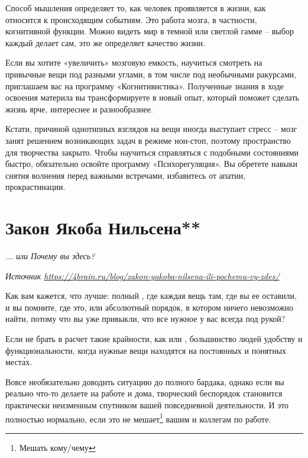 Способ мышления определяет то, как человек проявляется в жизни, как относится к происходящим событиям. Это работа мозга, в частности, когнитивной функции. Можно видеть мир в темной или светлой гамме – выбор каждый делает сам, это же определяет качество жизни.

Если вы хотите «увеличить» мозговую емкость, научиться смотреть на привычные вещи под разными углами, в том числе под необычными ракурсами, приглашаем вас на программу «Когнитивистика». Полученные знания в ходе освоения материла вы трансформируете в новый опыт, который поможет сделать жизнь ярче, интереснее и разнообразнее.

Кстати, причиной однотипных взглядов на вещи иногда выступает стресс – мозг занят решением возникающих задач в режиме нон-стоп, поэтому пространство для творчества закрыто. Чтобы научиться справляться с подобными состояниями быстро, обязательно освойте программу «Психорегуляция». Вы обретете навыки снятия волнения перед важными встречами, избавитесь от апатии, прокрастинации.



\newpage
\section{Закон Якоба Нильсена**}

\textit{... или Почему вы здесь?}

\textit{Источник \url{https://4brain.ru/blog/zakon-yakoba-nilsena-ili-pochemu-vy-zdes/}}

Как вам кажется, что лучше: полный , где каждая вещь  там, где вы ее оставили, и вы помните, где это, или абсолютный порядок, в котором ничего невозможно найти, потому что вы уже привыкли, что все нужное у вас всегда под рукой?

Если не брать в расчет такие крайности, как  или , большинство людей  удобству и функциональности, когда нужные вещи находятся на постоянных и понятных мест\'{а}х.

Вовсе необязательно доводить ситуацию до полного бардака, однако если вы реально что-то делаете на работе и дома, творческий беспорядок становится практически неизменным спутником вашей повседневной деятельности. И это полностью нормально, если это не мешает\footnote{Мешать кому/чему} вашим  и коллегам по работе.

